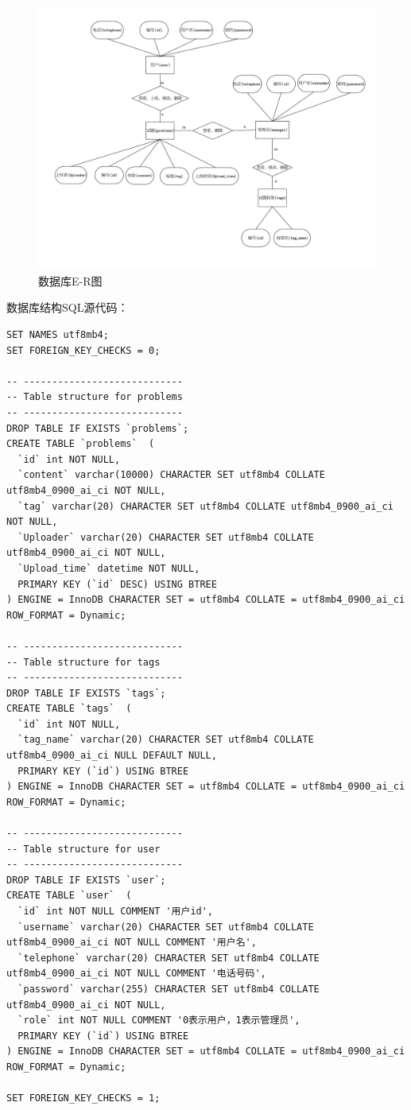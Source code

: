 \documentclass[a4paper,AutoFakeBold={2.7}]{ctexart} %
\begin{document}
\begin{figure}[]
    \centering
    \includegraphics[width=0.7\linewidth]{./图片/数据库E-R图.pdf}
    \caption{数据库E-R图}\label{数据库E-R图}
\end{figure}

数据库结构SQL源代码：

\begin{lstlisting}
SET NAMES utf8mb4;
SET FOREIGN_KEY_CHECKS = 0;

-- ----------------------------
-- Table structure for problems
-- ----------------------------
DROP TABLE IF EXISTS `problems`;
CREATE TABLE `problems`  (
  `id` int NOT NULL,
  `content` varchar(10000) CHARACTER SET utf8mb4 COLLATE utf8mb4_0900_ai_ci NOT NULL,
  `tag` varchar(20) CHARACTER SET utf8mb4 COLLATE utf8mb4_0900_ai_ci NOT NULL,
  `Uploader` varchar(20) CHARACTER SET utf8mb4 COLLATE utf8mb4_0900_ai_ci NOT NULL,
  `Upload_time` datetime NOT NULL,
  PRIMARY KEY (`id` DESC) USING BTREE
) ENGINE = InnoDB CHARACTER SET = utf8mb4 COLLATE = utf8mb4_0900_ai_ci ROW_FORMAT = Dynamic;

-- ----------------------------
-- Table structure for tags
-- ----------------------------
DROP TABLE IF EXISTS `tags`;
CREATE TABLE `tags`  (
  `id` int NOT NULL,
  `tag_name` varchar(20) CHARACTER SET utf8mb4 COLLATE utf8mb4_0900_ai_ci NULL DEFAULT NULL,
  PRIMARY KEY (`id`) USING BTREE
) ENGINE = InnoDB CHARACTER SET = utf8mb4 COLLATE = utf8mb4_0900_ai_ci ROW_FORMAT = Dynamic;

-- ----------------------------
-- Table structure for user
-- ----------------------------
DROP TABLE IF EXISTS `user`;
CREATE TABLE `user`  (
  `id` int NOT NULL COMMENT '用户id',
  `username` varchar(20) CHARACTER SET utf8mb4 COLLATE utf8mb4_0900_ai_ci NOT NULL COMMENT '用户名',
  `telephone` varchar(20) CHARACTER SET utf8mb4 COLLATE utf8mb4_0900_ai_ci NOT NULL COMMENT '电话号码',
  `password` varchar(255) CHARACTER SET utf8mb4 COLLATE utf8mb4_0900_ai_ci NOT NULL,
  `role` int NOT NULL COMMENT '0表示用户，1表示管理员',
  PRIMARY KEY (`id`) USING BTREE
) ENGINE = InnoDB CHARACTER SET = utf8mb4 COLLATE = utf8mb4_0900_ai_ci ROW_FORMAT = Dynamic;

SET FOREIGN_KEY_CHECKS = 1;
\end{lstlisting}
\end{document}
